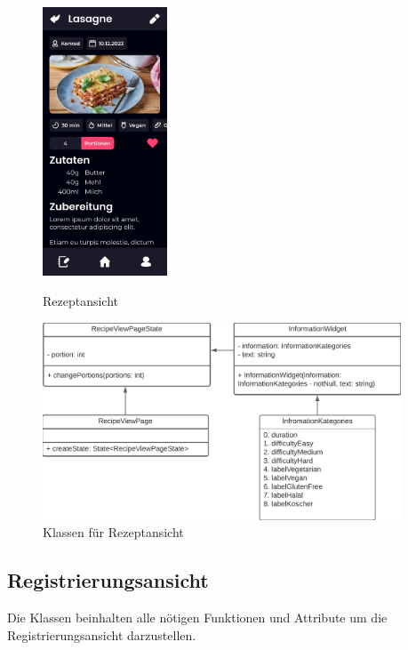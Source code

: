 \documentclass[parskip=full]{scrartcl}
\begin{document}
    \begin{figure}[htp]
        \begin{minipage}
            [t]{0.49\textwidth}
            \centering
            \includegraphics[height=80mm]{images/Presentation-layer/RecipeView.jpg}
            \caption{Rezeptansicht}
        \end{minipage}
        \begin{minipage}
            [t]{0.49\textwidth}
            \centering
            \includegraphics[width=0.95\textwidth]{images/Presentation-layer/RecipeViewClass.png}
            \caption{Klassen für Rezeptansicht}
        \end{minipage}
    \end{figure}    

    \newpage

\subsection{Registrierungsansicht}
    Die Klassen beinhalten alle nötigen Funktionen und Attribute um die Registrierungsansicht darzustellen.
\end{document}
